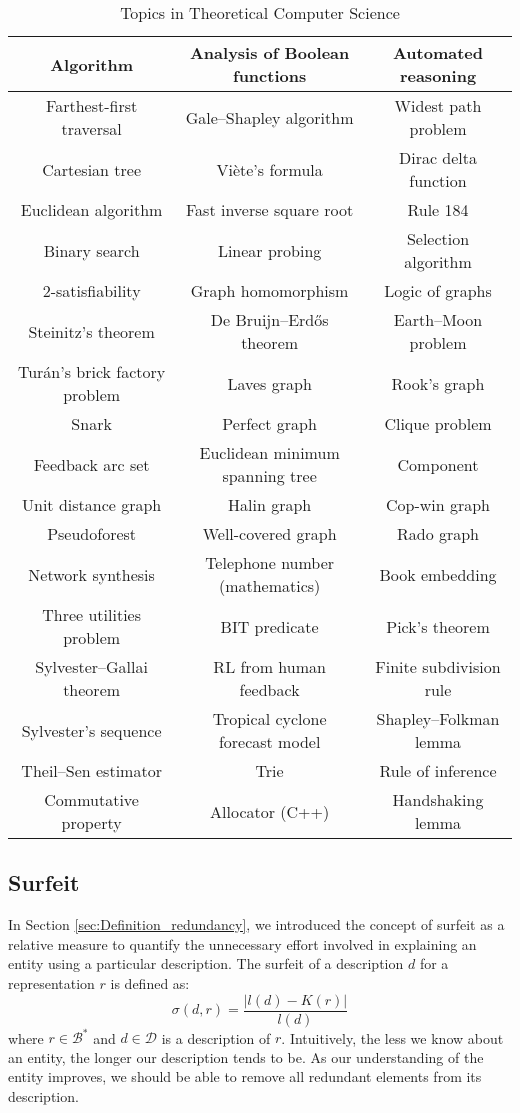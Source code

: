 \begin{table}
\begin{centering}
\begin{tabular}{|c|c|c|}
\hline 
Algorithm & Analysis of Boolean functions & Automated reasoning \tabularnewline
\hline 
Farthest-first traversal & Gale–Shapley algorithm & Widest path problem \tabularnewline
\hline
Cartesian tree & Viète's formula & Dirac delta function \tabularnewline
\hline
Euclidean algorithm & Fast inverse square root & Rule 184 \tabularnewline
\hline
Binary search & Linear probing & Selection algorithm \tabularnewline
\hline
2-satisfiability & Graph homomorphism & Logic of graphs \tabularnewline
\hline
Steinitz's theorem & De Bruijn–Erdős theorem & Earth–Moon problem \tabularnewline
\hline
Turán's brick factory problem & Laves graph & Rook's graph \tabularnewline
\hline
Snark & Perfect graph & Clique problem \tabularnewline
\hline
Feedback arc set & Euclidean minimum spanning tree & Component \tabularnewline
\hline
Unit distance graph & Halin graph & Cop-win graph \tabularnewline
\hline
Pseudoforest & Well-covered graph & Rado graph \tabularnewline
\hline
Network synthesis & Telephone number (mathematics) & Book embedding \tabularnewline
\hline
Three utilities problem & BIT predicate & Pick's theorem \tabularnewline
\hline
Sylvester–Gallai theorem & RL from human feedback & Finite subdivision rule \tabularnewline
\hline
Sylvester's sequence & Tropical cyclone forecast model & Shapley–Folkman lemma \tabularnewline
\hline
Theil–Sen estimator & Trie & Rule of inference \tabularnewline
\hline
Commutative property & Allocator (C++) & Handshaking lemma \tabularnewline
\hline
\end{tabular}
\par\end{centering}
\caption{\label{tab:Topics-in-theoretical-computer-science}Topics in Theoretical Computer Science}
\end{table}

\subsection{Surfeit}

In Section \ref{sec:Definition_redundancy}, we introduced the concept of surfeit as a relative measure to quantify the unnecessary effort involved in explaining an entity using a particular description. The surfeit of a description $d$ for a representation $r$ is defined as:
\[
\sigma (d, r) = \frac{ | l(d) - K(r) |}{l(d)}
\]
where $r \in \mathcal{B}^\ast$ and $d \in \mathcal{D}$ is a description of $r$. Intuitively, the less we know about an entity, the longer our description tends to be. As our understanding of the entity improves, we should be able to remove all redundant elements from its description.

